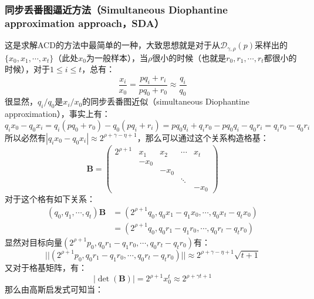 \documentclass{book}
\numberwithin{equation}{subsubsection}
\begin{document}
\subsubsection{同步丢番图逼近方法（Simultaneous Diophantine approximation approach，SDA）}
这是求解ACD的方法中最简单的一种，大致思想就是对于从$\mathcal{D}_{\gamma,\rho}(p)$采样出的$\{x_0,x_1,\cdots,x_t\}$（此处$x_0$为一般样本），当$\rho$很小的时候（也就是$r_0,r_1,\cdots,r_t$都很小的时候），对于$1\le i\le t$，总有：
\begin{equation}
    \frac{x_i}{x_0}=\frac{pq_i+r_i}{pq_0+r_0}\approx\frac{q_i}{q_0}
    \nonumber
\end{equation}
很显然，$q_i/q_0$是$x_i/x_0$的同步丢番图近似（simultaneous Diophantine approximation），事实上有：
\begin{equation}
    q_ix_0-q_0x_i=q_i(pq_0+r_0)-q_0(pq_i+r_i)=pq_0q_i+q_ir_0-pq_0q_i-q_0r_i=q_ir_0-q_0r_i
    \nonumber
\end{equation}
所以必然有$|q_ix_0-q_0x_i|\approx2^{\rho+\gamma-\eta+1}$，那么可以通过这个关系构造格基：
\begin{equation}
    \pmb{B}=\left(\begin{matrix}
        2^{\rho+1}&x_1&x_2&\cdots&x_t\\
        &-x_0&&&\\
        &&-x_0&&\\
        &&&\ddots&\\
        &&&&-x_0
    \end{matrix}\right)
    \nonumber
\end{equation}
对于这个格有如下关系：
\begin{equation}
    \begin{aligned}
        (q_0,q_1,\cdots,q_t)\pmb{B}&=(2^{\rho+1}q_0,q_0x_1-q_1x_0,\cdots,q_0x_t-q_tx_0)\\
        &=(2^{\rho+1}q_0,q_0r_1-q_1r_0,\cdots,q_0r_t-q_tr_0)
    \end{aligned}
    \nonumber
\end{equation}
显然对目标向量$(2^{\rho+1}p_0,q_0r_1-q_1r_0,\cdots,q_0r_t-q_tr_0)$有：
\begin{equation}
    ||(2^{\rho+1}p_0,q_0r_1-q_1r_0,\cdots,q_0r_t-q_tr_0)||\approx2^{\rho+\gamma-\eta+1}\sqrt{t+1}
    \nonumber
\end{equation}
又对于格基矩阵，有：
\begin{equation}
    |\det(\pmb{B})|=2^{\rho+1}x_0^t\approx2^{\rho+\gamma t+1}
    \nonumber
\end{equation}
那么由高斯启发式可知当：
\end{document}
